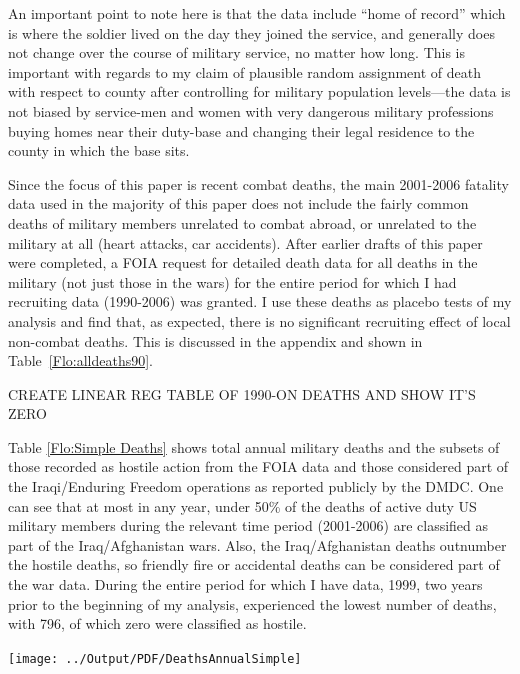 \documentclass[12pt] {article}
\begin{document}
An important point to note here is that the data include {}``home
of record'' which is where the soldier lived on the day they joined
the service, and generally does not change over the course of military service, no matter how long. This is important with regards to my claim of plausible
random assignment of death with respect to county after controlling
for military population levels---the data is not biased by service-men
and women with very dangerous military professions buying homes near
their duty-base and changing their legal residence to the county in
which the base sits. 

Since the focus of this paper is recent combat deaths, the main 2001-2006 fatality data used in the majority of this paper does not include the fairly common deaths of military members unrelated to combat abroad, or unrelated to the military at all (heart attacks, car accidents).  After earlier drafts of this paper were completed, a FOIA request for detailed death data for all  deaths in the military (not just those in the wars) for the entire period for which I had recruiting data (1990-2006) was granted. I use these deaths as placebo tests of my analysis and find that, as expected, there is no significant recruiting effect of local non-combat deaths. This is discussed in the appendix and shown in Table~\ref{Flo:alldeaths90}.

CREATE LINEAR REG TABLE OF 1990-ON DEATHS AND SHOW IT'S ZERO 
 
Table \ref{Flo:Simple Deaths} shows total annual military deaths and the subsets of those recorded as hostile action from the FOIA data and those considered part of the Iraqi/Enduring Freedom operations as reported publicly by the DMDC. One can see that at most in any year, under 50\% of the deaths of active duty US military members during the relevant time period (2001-2006) are classified as part of the Iraq/Afghanistan wars. Also, the Iraq/Afghanistan deaths outnumber the hostile deaths, so friendly fire or accidental deaths can be considered part of the war data. During the entire period for which I have data, 1999, two years prior to the beginning of my analysis, experienced the lowest number of deaths, with  796, of which zero were classified as hostile. 

\begin{table}
\caption{}
\label{Flo:Simple Deaths}\texttt{[image: ../Output/PDF/DeathsAnnualSimple]}
\end{table}
\end{document}
